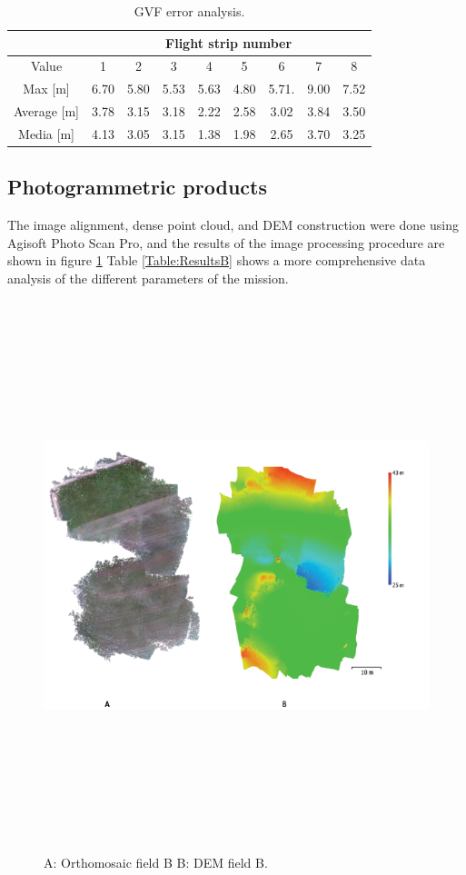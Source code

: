 \begin{table}[H]
\centering
\begin{tabular}{|c|c|c|c|c|c|c|c|c|}
\hline
                & \multicolumn{8}{c|}{Flight strip number}               \\ \hline
Value           & 1    & 2    & 3    & 4    & 5    & 6     & 7    & 8    \\ \hline
Max {[}m{]}     & 6.70 & 5.80 & 5.53 & 5.63 & 4.80 & 5.71. & 9.00 & 7.52 \\ \hline
Average {[}m{]} & 3.78 & 3.15 & 3.18 & 2.22 & 2.58 & 3.02  & 3.84 & 3.50 \\ \hline
Media {[}m{]}   & 4.13 & 3.05 & 3.15 & 1.38 & 1.98 & 2.65  & 3.70 & 3.25 \\ \hline
\end{tabular}
\caption{GVF error analysis.}
\label{Table:errorGVF}
\end{table}

\subsection{Photogrammetric products}
The image alignment, dense point cloud, and DEM construction were done using Agisoft Photo Scan Pro, and the results of the image processing procedure are shown in figure \ref{fig:ResultBprocessing} Table \ref{Table:ResultsB} shows a more comprehensive data analysis of the different parameters of the mission.
\begin{figure}[H]
\centering
\includegraphics[width=16cm,height=16cm,keepaspectratio]{imagenes/ResutsB.png}
\caption{ A: Orthomosaic field B B: DEM field B.}
\label{fig:ResultBprocessing}
\end{figure}

